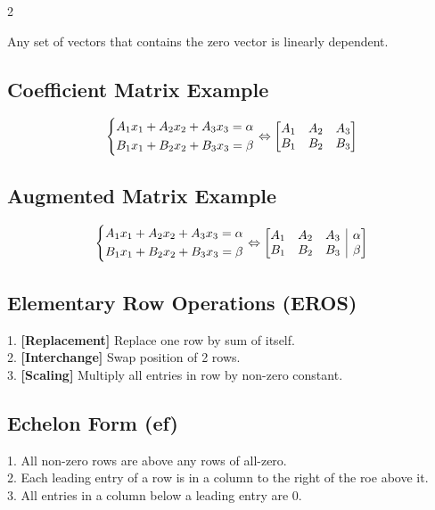 \documentclass[5pt]{article}
\makeatletter
\newenvironment{amatrix}[1]{%
  \left[\begin{array}{@{}*{#1}{c}|c@{}}
}{%
  \end{array}\right]
}
\makeatother
\begin{document}
\begin{multicols}{2}
\begin{theorem}
  Any set of vectors that contains the zero vector is linearly dependent.
\end{theorem}

\subsection{Coefficient Matrix Example}
\begin{equation}
\centering
\left\{\begin{split}
A_1x_1+A_2x_2+A_3x_3=\alpha \\
B_1x_1+B_2x_2+B_3x_3=\beta \\
\end{split}\right.
\Leftrightarrow
\begin{bmatrix}
    A_1 & A_2 & A_3\\
    B_1 & B_2 & B_3\\
\end{bmatrix}
\end{equation}

\subsection{Augmented Matrix Example}
\begin{equation}
\left\{\begin{split}
A_1x_1+A_2x_2+A_3x_3=\alpha \\
B_1x_1+B_2x_2+B_3x_3=\beta \\
\end{split}\right.
\Leftrightarrow
\begin{amatrix}{3}
    A_1 & A_2 & A_3 & \alpha \\
    B_1 & B_2 & B_3 & \beta \\
 \end{amatrix}
\end{equation}

\subsection{Elementary Row Operations (EROS)}
1. \textbf{[Replacement]} Replace one row by sum of itself. \\
2. \textbf{[Interchange]} Swap position of 2 rows. \\
3. \textbf{[Scaling]} Multiply all entries in row by non-zero constant. \\


\subsection{Echelon Form (ef)}
1. All non-zero rows are above any rows of all-zero. \\
2. Each leading entry of a row is in a column to the right of the roe above it. \\
3. All entries in a column below a leading entry are 0. \\



\end{multicols}
\end{document}

